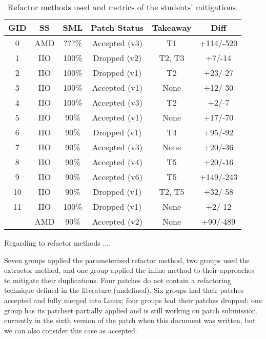 \documentclass[10pt,conference]{IEEEtran}
\begin{document}
\begin{table}[ht]
\centering
\caption{Refactor methods used and metrics of the students' mitigations.}
\begin{tabular}{ |c |c |c |c |c | c| }
\hline
\textbf{GID} & \textbf{SS} & \textbf{SML} & \textbf{Patch Status} & \textbf{Takeaway} & \textbf{Diff} \\
\hline
0 & AMD & ???\% & Accepted (v3) & T1 & +114/-520 \\ \hline
1 & IIO & 100\% & Dropped (v2) & T2, T3 & +7/-14 \\ \hline
2 & IIO & 100\% & Dropped (v1) & T2 & +23/-27 \\ \hline
3 & IIO & 100\% & Accepted (v1) & None & +12/-30 \\ \hline
4 & IIO & 100\% & Accepted (v3) & T2 & +2/-7 \\ \hline
5 & IIO & 90\% & Accepted (v1) & None & +17/-70 \\ \hline
6 & IIO & 90\% & Dropped (v1) & T4 & +95/-92 \\ \hline
7 & IIO & 90\% & Accepted (v3) & None & +20/-36 \\ \hline
8 & IIO & 90\% & Accepted (v4) & T5 & +20/-16 \\ \hline
9 & IIO & 90\% & Accepted (v6) & T5 & +149/-243 \\ \hline
10 & IIO & 90\% & Dropped (v1) & T2, T5 & +32/-58 \\ \hline
11 & IIO & 100\% & Dropped (v1) & None & +2/-12 \\
   & AMD & 90\% & Accepted (v2) & None & +90/-489 \\ \hline

\end{tabular}%

\label{tab:stu}
\end{table}

Regarding to refactor methods ....

Seven groups applied the parameterized refactor method, two groups used the extractor method, and one group applied the inline method to their approaches to mitigate their duplications. Four patches do not contain a refactoring technique defined in the literature (undefined). Six groups had their patches accepted and fully merged into Linux; four groups had their patches dropped; one group has its patchset partially applied and is still working on patch submission, currently in the sixth version of the patch when this document was written, but we can also consider this case as accepted.
\end{document}
